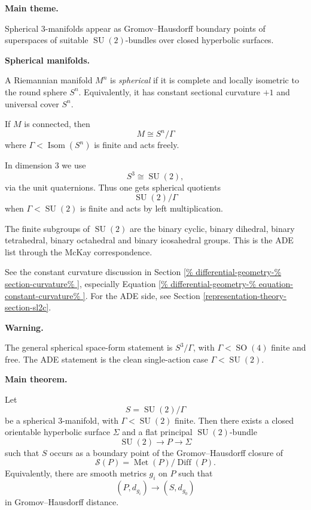 \medskip\noindent
{\bf Main theme.}

Spherical $3$-manifolds appear as
Gromov--Hausdorff boundary points of
superspaces of suitable
$\operatorname{SU}(2)$-bundles over
closed hyperbolic surfaces.

\medskip\noindent
{\bf Spherical manifolds.}

\begin{definition}
\label{definition-riemannian}
A Riemannian manifold $M^n$ is
{\it spherical} if it is complete and
locally isometric to the round sphere
$S^n$.
Equivalently, it has constant
sectional curvature $+1$ and
universal cover $S^n$.
\end{definition}

If $M$ is connected, then
$$
        M \cong S^n/\Gamma
$$
where $\Gamma<\operatorname{Isom}(S^n)$
is finite and acts freely.

In dimension $3$ we use
$$
        S^3\cong \operatorname{SU}(2),
$$
via the unit quaternions.
Thus one gets spherical quotients
$$
        \operatorname{SU}(2)/\Gamma
$$
when $\Gamma<\operatorname{SU}(2)$ is
finite and acts by left multiplication.

The finite subgroups of
$\operatorname{SU}(2)$ are the binary
cyclic, binary dihedral, binary
tetrahedral, binary octahedral and
binary icosahedral groups.
This is the ADE list through the
McKay correspondence.

See the constant curvature discussion in
Section
\ref{%
differential-geometry-%
section-curvature%
},
especially Equation
\ref{%
differential-geometry-%
equation-constant-curvature%
}.
For the ADE side, see Section
\ref{representation-theory-section-sl2c}.

\medskip\noindent
{\bf Warning.}

The general spherical space-form
statement is $S^3/\Gamma$, with
$\Gamma<\operatorname{SO}(4)$ finite and
free.
The ADE statement is the clean
single-action case
$\Gamma<\operatorname{SU}(2)$.

\medskip\noindent
{\bf Main theorem.}

\begin{theorem}
\label{theorem-spherical-gh}
Let
$$
        S=\operatorname{SU}(2)/\Gamma
$$
be a spherical $3$-manifold, with
$\Gamma<\operatorname{SU}(2)$ finite.
Then there exists a closed orientable
hyperbolic surface $\Sigma$ and a flat
principal $\operatorname{SU}(2)$-bundle
$$
        \operatorname{SU}(2)\to P\to\Sigma
$$
such that $S$ occurs as a boundary point
of the Gromov--Hausdorff closure of
$$
        {\mathcal S}(P)
        =
        \operatorname{Met}(P)/
        \operatorname{Diff}(P).
$$
Equivalently, there are smooth metrics
$g_i$ on $P$ such that
$$
        (P,d_{g_i})\to (S,d_{g_0})
$$
in Gromov--Hausdorff distance.
\end{theorem}

